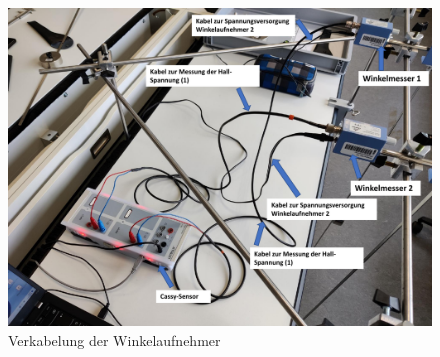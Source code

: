 \begin{figure}[H]
	\centering
	\includegraphics[width=1\textwidth]{verkabelung.pdf}
	\caption{Verkabelung der Winkelaufnehmer}
	\label{fig:verkabelung}
\end{figure}

